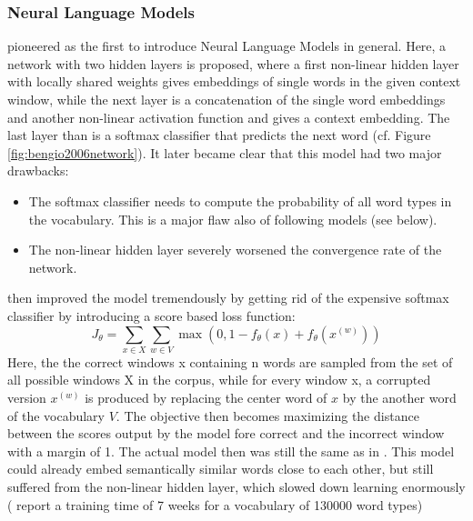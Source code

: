 \documentclass[11pt]{article}
\begin{document}
\subsubsection{Neural Language Models}
 \cite{bengio2003neural} pioneered as the first to introduce Neural Language Models in general. Here, a network with two hidden layers is proposed, where a first non-linear hidden layer with locally shared weights gives embeddings of single words in the given context window, while the next layer is a concatenation of the single word embeddings and another non-linear activation function and gives a context embedding. The last layer than is a softmax classifier that predicts the next word (cf. Figure \ref{fig:bengio2006network}). 
It later became clear that this model had two major drawbacks:
\begin{itemize}  
\item The softmax classifier needs to compute the probability of all word types in the vocabulary. This is a major flaw also of following models (see below).
\item The non-linear hidden layer severely worsened the convergence rate of the network.
\end{itemize}
\cite{collobert2008unified} then improved the model tremendously by getting rid of the expensive softmax classifier by introducing a score based loss function: 
\begin{equation}
J_{\theta} = \sum_{x\in X}\sum_{w\in V}\max(0,1-f_{\theta}(x)+f_{\theta}(x^{(w)}))
\label{eq:bengio2006network_loss}
\end{equation}
Here, the the correct windows x containing n words are sampled from the set of all possible windows X in the corpus, while for every window x, a corrupted version $x^{(w)}$ is produced by replacing the center word of $x$ by the another word of the vocabulary $V$. The objective then becomes maximizing the distance between the scores output by the model fore correct and the incorrect window with a margin of 1. The actual model then was still the same as in \cite{bengio2003neural}. This model could already embed semantically similar words close to each other, but still suffered from the non-linear hidden layer, which slowed down learning enormously (\cite{bengio2003neural} report a training time of 7 weeks for a vocabulary of 130000 word types)
\end{document}
